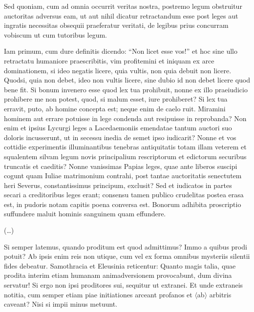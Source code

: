 Sed quoniam, cum ad omnia occurrit veritas nostra, postremo legum obstruitur auctoritas adversus eam, ut aut nihil dicatur retractandum esse post leges aut ingratis necessitas obsequii praeferatur veritati, de legibus prius concurram vobiscum ut cum tutoribus legum.

Iam primum, cum dure definitis dicendo: ``Non licet esse vos!'' et hoc sine ullo retractatu humaniore praescribitis, vim profitemini et iniquam ex arce dominationem, si ideo negatis licere, quia vultis, non quia debuit non licere. Quodsi, quia non debet, ideo non vultis licere, sine dubio id non debet licere quod bene fit. Si bonum invenero esse quod lex tua prohibuit, nonne ex illo praeiudicio prohibere me non potest, quod, si malum esset, iure prohiberet? Si lex tua erravit, puto, ab homine concepta est; neque enim de caelo ruit. Miramini hominem aut errare potuisse in lege condenda aut resipuisse in reprobanda? Non enim et ipsius Lycurgi leges a Lacedaemoniis emendatae tantum auctori suo doloris incusserunt, ut in secessu inedia de semet ipso iudicarit? Nonne et vos cottidie experimentis illuminantibus tenebras antiquitatis totam illam veterem et squalentem silvam legum novis principalium rescriptorum et edictorum securibus truncatis et caeditis? Nonne vanissimas Papias leges, quae ante liberos suscipi cogunt quam Iuliae matrimonium contrahi, post tantae auctoritatis senectutem heri Severus, constantissimus principum, exclusit? Sed et iudicatos in partes secari a creditoribus leges erant; consensu tamen publico crudelitas postea erasa est, in pudoris notam capitis poena conversa est. Bonorum adhibita proscriptio suffundere maluit hominis sanguinem quam effundere.

(\dots)

Si semper latemus, quando proditum est quod admittimus? Immo a quibus prodi potuit? Ab ipsis enim reis non utique, cum vel ex forma omnibus mysteriis silentii fides debeatur. Samothracia et Eleusinia reticentur: Quanto magis talia, quae prodita interim etiam humanam animadversionem provocabunt, dum divina servatur! Si ergo non ipsi proditores sui, sequitur ut extranei. Et unde extraneis notitia, cum semper etiam piae initiationes arceant profanos et $\langle$ab$\rangle$ arbitris caveant? Nisi si impii minus metuunt.

